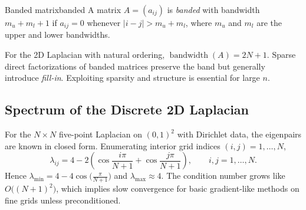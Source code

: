 \begin{definition}{Banded matrix}{banded}
    A matrix $A=(a_{ij})$ is \emph{banded} with bandwidth $m_u+m_l+1$ if $a_{ij}=0$ whenever $|i-j|>m_u+m_l$, where $m_u$ and $m_l$ are the upper and lower bandwidths.
\end{definition}

For the 2D Laplacian with natural ordering, $\operatorname{bandwidth}(A)=2N+1$. Sparse direct factorizations of banded matrices preserve the band but generally introduce \emph{fill-in}. Exploiting sparsity and structure is essential for large $n$.

\subsection{Spectrum of the Discrete 2D Laplacian}
For the $N\times N$ five-point Laplacian on $(0,1)^2$ with Dirichlet data, the eigenpairs are known in closed form. Enumerating interior grid indices $(i,j)=1,\dots,N$,
\[
  \lambda_{ij} = 4 - 2\left(\cos\frac{i\pi}{N+1} + \cos\frac{j\pi}{N+1}\right),\qquad i,j=1,\dots,N.
\]
Hence $\lambda_{\min}=4-4\cos\bigl(\tfrac{\pi}{N+1}\bigr)$ and $\lambda_{\max}\approx 4$. The condition number grows like $O\big((N+1)^2\big)$, which implies slow convergence for basic gradient-like methods on fine grids unless preconditioned.

